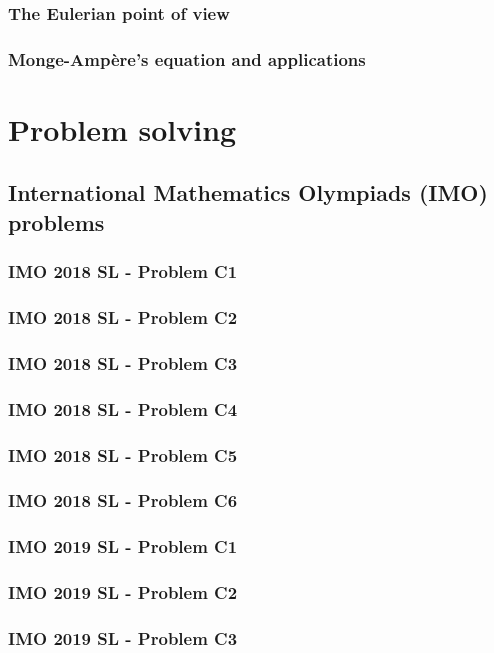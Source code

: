 \documentclass[12pt,openany,oneside]{book}
\theoremstyle{definition}
\numberwithin{definition}{section}
\numberwithin{theorem}{section}
\numberwithin{corollary}{section}
\numberwithin{proposition}{section}
\numberwithin{notation}{section}
\numberwithin{remark}{section}
\numberwithin{hypothesis}{section}
\begin{document}
\section{The Eulerian point of view}
\section{Monge-Ampère's equation and applications}

\part{Problem solving}

\chapter{International Mathematics Olympiads (IMO) problems}

\section{IMO 2018 SL - Problem C1}
\section{IMO 2018 SL - Problem C2}
\section{IMO 2018 SL - Problem C3}
\section{IMO 2018 SL - Problem C4}
\section{IMO 2018 SL - Problem C5}
\section{IMO 2018 SL - Problem C6}

\section{IMO 2019 SL - Problem C1}
\section{IMO 2019 SL - Problem C2}
\section{IMO 2019 SL - Problem C3}
\end{document}
